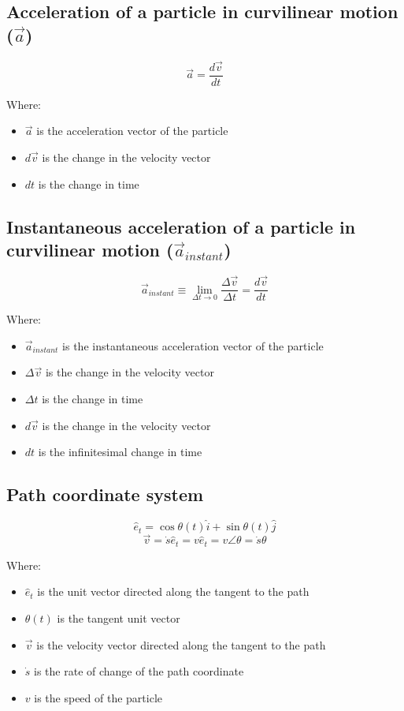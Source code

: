 \documentclass[11pt]{article}
\begin{document}
\subsection{Acceleration of a particle in curvilinear motion (\(\vec{a}\))}
\label{sec:org3a4d0ba}
\[\vec{a} = \frac{d \vec{v}}{dt}\]

Where:
\begin{itemize}
\item \(\vec{a}\) is the acceleration vector of the particle
\item \(d \vec{v}\) is the change in the velocity vector
\item \(dt\) is the change in time
\end{itemize}

\subsection{Instantaneous acceleration of a particle in curvilinear motion (\(\vec{a}_{instant}\))}
\label{sec:org9284e42}
\[\vec{a}_{instant} \equiv \lim_{\Delta t \rightarrow 0} \frac{\Delta \vec{v}}{\Delta t} = \frac{d \vec{v}}{dt}\]

Where:
\begin{itemize}
\item \(\vec{a}_{instant}\) is the instantaneous acceleration vector of the particle
\item \(\Delta \vec{v}\) is the change in the velocity vector
\item \(\Delta t\) is the change in time
\item \(d \vec{v}\) is the change in the velocity vector
\item \(dt\) is the infinitesimal change in time
\end{itemize}

\subsection{Path coordinate system}
\label{sec:org0577790}
\[\hat{e}_t = \cos \theta (t) \hat{i} + \sin \theta (t) \hat{j}\]
\[\vec{v} = \dot{s} \hat{e}_t = v \hat{e}_t = v \angle \theta = \dot{s} \theta\]

Where:
\begin{itemize}
\item \(\hat{e}_t\) is the unit vector directed along the tangent to the path
\item \(\theta (t)\) is the tangent unit vector
\item \(\vec{v}\) is the velocity vector directed along the tangent to the path
\item \(\dot{s}\) is the rate of change of the path coordinate
\item \(v\) is the speed of the particle
\end{itemize}
\end{document}
